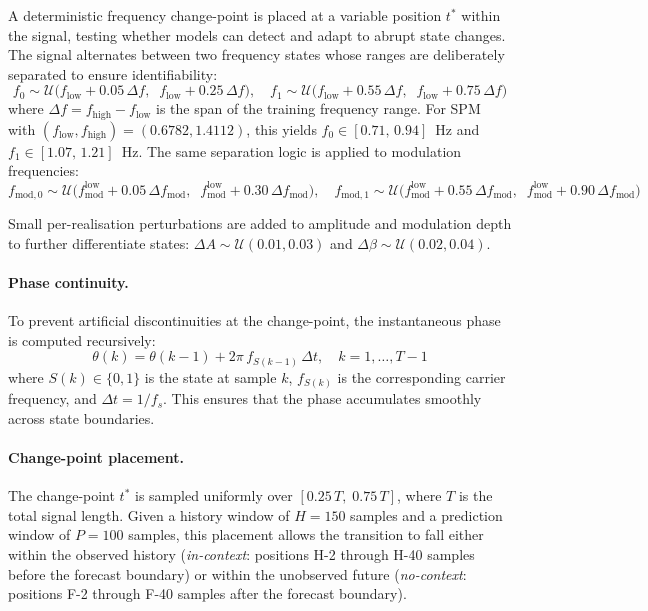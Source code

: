 \documentclass[11pt]{article}
\begin{document}
A deterministic frequency change-point is placed at a variable position $t^*$ within the signal, testing whether models can detect and adapt to abrupt state changes. The signal alternates between two frequency states whose ranges are deliberately separated to ensure identifiability:
\begin{equation}
    f_0 \sim \mathcal{U}\!\bigl(f_{\mathrm{low}} + 0.05\,\Delta f,\;\; f_{\mathrm{low}} + 0.25\,\Delta f\bigr), \quad
    f_1 \sim \mathcal{U}\!\bigl(f_{\mathrm{low}} + 0.55\,\Delta f,\;\; f_{\mathrm{low}} + 0.75\,\Delta f\bigr)
    \label{eq:freq_sep}
\end{equation}
where $\Delta f = f_{\mathrm{high}} - f_{\mathrm{low}}$ is the span of the training frequency range. For SPM with $(f_{\mathrm{low}}, f_{\mathrm{high}}) = (0.6782, 1.4112)$, this yields $f_0 \in [0.71,\, 0.94]$~Hz and $f_1 \in [1.07,\, 1.21]$~Hz. The same separation logic is applied to modulation frequencies:
\begin{equation}
    f_{\mathrm{mod},0} \sim \mathcal{U}\!\bigl(f_{\mathrm{mod}}^{\mathrm{low}} + 0.05\,\Delta f_{\mathrm{mod}},\;\; f_{\mathrm{mod}}^{\mathrm{low}} + 0.30\,\Delta f_{\mathrm{mod}}\bigr), \quad
    f_{\mathrm{mod},1} \sim \mathcal{U}\!\bigl(f_{\mathrm{mod}}^{\mathrm{low}} + 0.55\,\Delta f_{\mathrm{mod}},\;\; f_{\mathrm{mod}}^{\mathrm{low}} + 0.90\,\Delta f_{\mathrm{mod}}\bigr)
    \label{eq:fmod_sep}
\end{equation}

Small per-realisation perturbations are added to amplitude and modulation depth to further differentiate states: $\Delta A \sim \mathcal{U}(0.01, 0.03)$ and $\Delta\beta \sim \mathcal{U}(0.02, 0.04)$.

\paragraph{Phase continuity.}
To prevent artificial discontinuities at the change-point, the instantaneous phase is computed recursively:
\begin{equation}
    \theta(k) = \theta(k-1) + 2\pi\, f_{S(k-1)}\, \Delta t, \quad k = 1, \ldots, T-1
    \label{eq:phase_cont}
\end{equation}
where $S(k) \in \{0, 1\}$ is the state at sample $k$, $f_{S(k)}$ is the corresponding carrier frequency, and $\Delta t = 1/f_s$. This ensures that the phase accumulates smoothly across state boundaries.

\paragraph{Change-point placement.}
The change-point $t^*$ is sampled uniformly over $[0.25\,T,\; 0.75\,T]$, where $T$ is the total signal length. Given a history window of $H = 150$ samples and a prediction window of $P = 100$ samples, this placement allows the transition to fall either within the observed history (\textit{in-context}: positions H-2 through H-40 samples before the forecast boundary) or within the unobserved future (\textit{no-context}: positions F-2 through F-40 samples after the forecast boundary).
\end{document}
